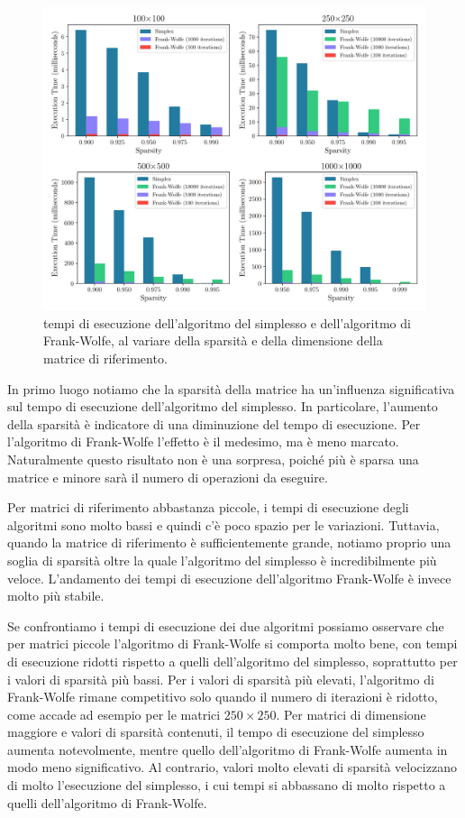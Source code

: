 \begin{figure}[!ht]
    \centering
    \includegraphics[width=\textwidth]{assets/figures/timesize.pdf}
    \caption{tempi di esecuzione dell'algoritmo del simplesso e dell'algoritmo di Frank-Wolfe, al variare della sparsità
    e della dimensione della matrice di riferimento.}
    \label{fig:timesize}
\end{figure}

In primo luogo notiamo che la sparsità della matrice ha un'influenza significativa sul tempo di esecuzione
dell'algoritmo del simplesso.  In particolare,
l'aumento della sparsità è indicatore di una diminuzione del tempo di esecuzione.
Per l'algoritmo di Frank-Wolfe l'effetto è il medesimo, ma è meno marcato.
Naturalmente
questo risultato non è una sorpresa, poiché più è sparsa una matrice e minore sarà il numero di operazioni da eseguire.

Per matrici di riferimento abbastanza piccole, i tempi di esecuzione degli algoritmi sono molto bassi e quindi
c'è poco spazio per le variazioni. Tuttavia, quando la matrice di riferimento è sufficientemente grande, notiamo proprio
una soglia di sparsità oltre la quale l'algoritmo del simplesso è incredibilmente più veloce. L'andamento dei tempi di
esecuzione dell'algoritmo Frank-Wolfe è invece molto più stabile.

Se confrontiamo i tempi di esecuzione dei due algoritmi possiamo osservare che per matrici piccole l'algoritmo di
Frank-Wolfe si comporta molto bene, con tempi di esecuzione ridotti rispetto a quelli dell'algoritmo del
simplesso, soprattutto per i valori di sparsità più bassi. Per i valori di sparsità più elevati, l'algoritmo di
Frank-Wolfe rimane competitivo solo quando il numero di iterazioni è ridotto, come accade ad esempio per le matrici \(
250\times 250 \). Per matrici di dimensione maggiore e valori di sparsità contenuti, il tempo di esecuzione del simplesso aumenta notevolmente, mentre
quello dell'algoritmo di Frank-Wolfe aumenta in modo meno significativo. Al contrario, valori molto elevati di
sparsità velocizzano di molto l'esecuzione del simplesso, i cui tempi si abbassano di molto rispetto a quelli
dell'algoritmo di Frank-Wolfe.


